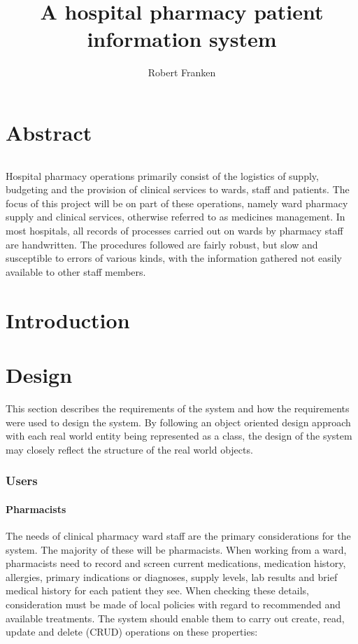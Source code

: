 \documentclass[letterpaper]{amsart}
\author{Robert Franken}
\title{A hospital pharmacy patient information system}
\begin{document}
\maketitle
\part{Abstract}
\paragraph{} Hospital pharmacy operations primarily consist of the logistics of supply, budgeting and the provision of clinical services to wards, staff and patients. 
The focus of this project will be on part of these operations, namely ward pharmacy supply and clinical services, otherwise referred to as medicines management. In most hospitals, all records of processes carried out on wards by pharmacy staff are handwritten. The procedures followed are fairly robust, but slow and susceptible to errors of various kinds, with the information gathered not easily available to other staff members.
\part{Introduction}

\part{Design}
This section describes the requirements of the system and how the requirements were used to design the system. By following an object oriented design approach with each real world entity being represented as a class, the design of the system may closely reflect the structure of the real world objects.

\section{Users} 
\subsection{Pharmacists}
The needs of clinical pharmacy ward staff are the primary considerations for the system.  The majority of these will be pharmacists.  When working from a ward, pharmacists need to record and screen current medications, medication history, allergies, primary indications or diagnoses, supply levels, lab results and brief medical history for each patient they see.
When checking these details, consideration must be made of local policies with regard to recommended and available treatments.  The system should enable them to carry out create, read, update and delete (CRUD) operations on these properties:
\end{document}
